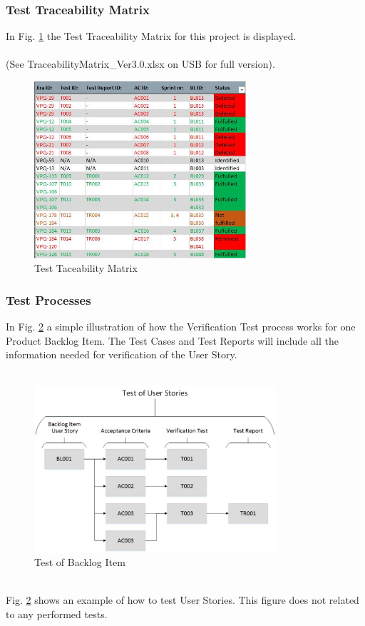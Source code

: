\newpage

\subsubsection*{Test Traceability Matrix}
In Fig. \ref{fig:Tmatrix} the Test Traceability Matrix for this project is displayed.\\\\ (See TraceabilityMatrix\_Ver3.0.xlsx on USB for full version).

\begin{figure}[h]
    \centering
        \includegraphics[width=0.7\textwidth]{VAPIQ-PICTURES/Tmatrix}
        \caption{Test Taceability Matrix}
        \label{fig:Tmatrix}
\end{figure}

\newpage

\subsubsection*{Test Processes}
In Fig. \ref{fig:testsetup} a simple illustration of how the Verification Test process works for one Product Backlog Item. The Test Cases and Test Reports will include all the information needed for verification of the User Story.\\
\\
\begin{figure}[h]
    \centering
        \includegraphics[width=0.8\textwidth]{VAPIQ-PICTURES/testdocbild}
        \caption{Test of Backlog Item}
        \label{fig:testsetup}
\end{figure}
\\
Fig. \ref{fig:testsetup} shows an example of how to test User Stories. This figure does not related to any performed tests.\\

